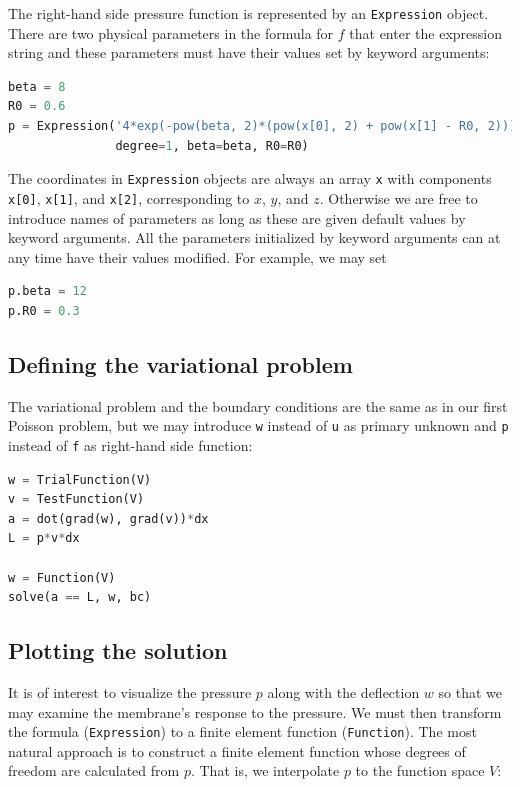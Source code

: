 \documentclass[graybox,envcountchap,sectrefs,final]{svmonodo}
\begin{document}

The right-hand side pressure function
is represented by an \texttt{Expression} object. There
are two physical parameters in the formula for $f$ that enter the
expression string and these parameters must have their values set
by keyword arguments:

\begin{lstlisting}[language=Python,style=graycolor]
beta = 8
R0 = 0.6
p = Expression('4*exp(-pow(beta, 2)*(pow(x[0], 2) + pow(x[1] - R0, 2)))',
               degree=1, beta=beta, R0=R0)
\end{lstlisting}
The coordinates in \texttt{Expression} objects are always an array
\texttt{x} with components \texttt{x[0]}, \texttt{x[1]}, and \texttt{x[2]}, corresponding to
$x$, $y$, and $z$.
Otherwise we are free to introduce names of parameters as long as
these are given default values by keyword arguments. All the
parameters initialized by keyword arguments can at any time have their
values modified. For example, we may set

\begin{lstlisting}[language=Python,style=graycolor]
p.beta = 12
p.R0 = 0.3
\end{lstlisting}

\subsection{Defining the variational problem}

The variational problem and the boundary conditions are the same as in
our first Poisson problem, but we may introduce \texttt{w} instead of \texttt{u} as
primary unknown and \texttt{p} instead of \texttt{f} as right-hand side function:

\begin{lstlisting}[language=Python,style=graycolor]
w = TrialFunction(V)
v = TestFunction(V)
a = dot(grad(w), grad(v))*dx
L = p*v*dx

w = Function(V)
solve(a == L, w, bc)
\end{lstlisting}


\subsection{Plotting the solution}

It is of interest to visualize the pressure $p$ along with the
deflection $w$ so that we may examine the membrane's response to the
pressure. We must then transform the formula (\texttt{Expression}) to a
finite element function (\texttt{Function}). The most natural approach is to
construct a finite element function whose degrees of freedom are
calculated from $p$. That is, we interpolate $p$ to the function space
$V$:
\end{document}
